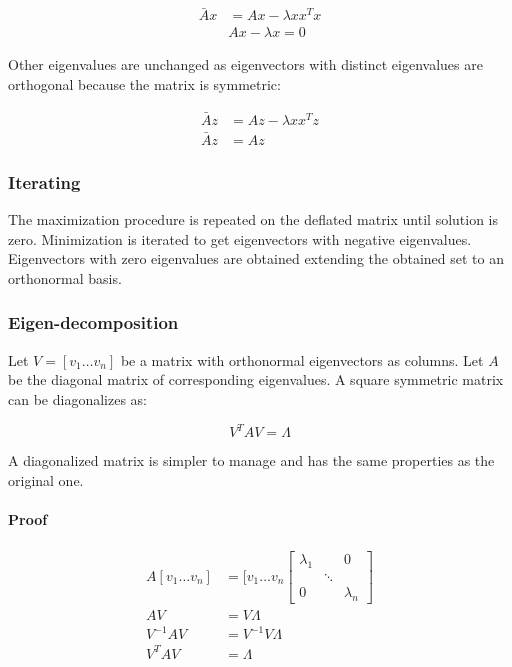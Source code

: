 		\begin{align*}
			\bar{A}x &= Ax -\lambda xx^Tx\\
				 &Ax-\lambda x = 0
		\end{align*}
		
		Other eigenvalues are unchanged as eigenvectors with distinct eigenvalues are orthogonal because the matrix is symmetric:

		\begin{align*}
			\bar{A}z &= Az-\lambda xx^Tz\\
			\bar{A}z &=Az
		\end{align*}

		\subsubsection{Iterating}
		The maximization procedure is repeated on the deflated matrix until solution is zero.
		Minimization is iterated to get eigenvectors with negative eigenvalues.
		Eigenvectors with zero eigenvalues are obtained extending the obtained set to an orthonormal basis.
		
		\subsubsection{Eigen-decomposition}
		Let $V = [v_1 \dots v_n]$ be a matrix with orthonormal eigenvectors as columns.
		Let $A$ be the diagonal matrix of corresponding eigenvalues.
		A square symmetric matrix can be diagonalizes as:

		$$V^TAV=\Lambda$$

		A diagonalized matrix is simpler to manage and has the same properties as the original one.

			\paragraph{Proof}

			\begin{align*}
				A[v_1\dots v_n] &= [v_1\dots v_n \begin{bmatrix}\lambda_1 & & 0\\ & \ddots & \\ 0 & & \lambda_n\end{bmatrix}\\
				AV &= V\Lambda\\
				V^{-1}AV &= V^{-1}V\Lambda\\
				V^TAV &= \Lambda
			\end{align*}

